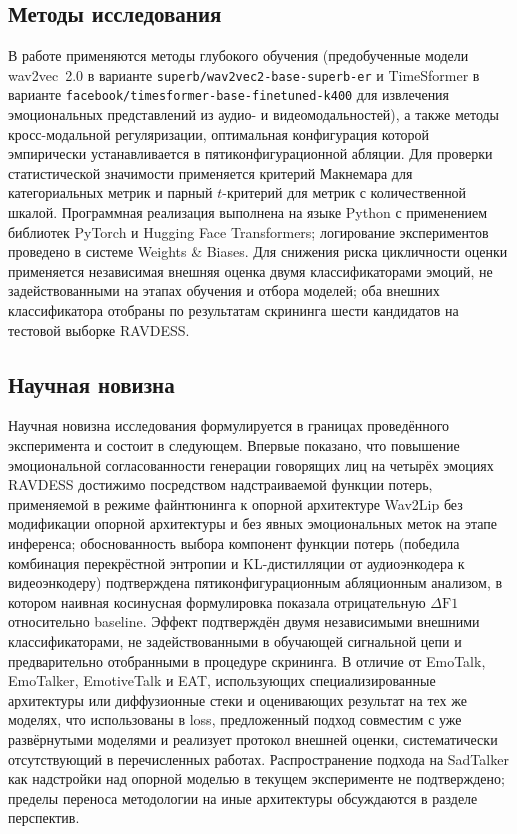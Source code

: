 \documentclass[a4paper, 12pt, oneside, openany]{article}
\begin{document}
\subsection{Методы исследования}

В работе применяются методы глубокого обучения (предобученные модели wav2vec~2.0 в варианте \texttt{superb/wav2vec2-base-superb-er} и TimeSformer в варианте \texttt{facebook/timesformer-base-finetuned-k400} для извлечения эмоциональных представлений из аудио- и видеомодальностей), а также методы кросс-модальной регуляризации, оптимальная конфигурация которой эмпирически устанавливается в пятиконфигурационной абляции. Для проверки статистической значимости применяется критерий Макнемара для категориальных метрик и парный $t$-критерий для метрик с количественной шкалой. Программная реализация выполнена на языке Python с применением библиотек PyTorch и Hugging Face Transformers; логирование экспериментов проведено в системе Weights \& Biases. Для снижения риска цикличности оценки применяется независимая внешняя оценка двумя классификаторами эмоций, не задействованными на этапах обучения и отбора моделей; оба внешних классификатора отобраны по результатам скрининга шести кандидатов на тестовой выборке RAVDESS.

\subsection{Научная новизна}

Научная новизна исследования формулируется в границах проведённого эксперимента и состоит в следующем. Впервые показано, что повышение эмоциональной согласованности генерации говорящих лиц на четырёх эмоциях RAVDESS достижимо посредством надстраиваемой функции потерь, применяемой в режиме файнтюнинга к опорной архитектуре Wav2Lip без модификации опорной архитектуры и без явных эмоциональных меток на этапе инференса; обоснованность выбора компонент функции потерь (победила комбинация перекрёстной энтропии и KL-дистилляции от аудиоэнкодера к видеоэнкодеру) подтверждена пятиконфигурационным абляционным анализом, в котором наивная косинусная формулировка показала отрицательную $\Delta\text{F1}$ относительно baseline. Эффект подтверждён двумя независимыми внешними классификаторами, не задействованными в обучающей сигнальной цепи и предварительно отобранными в процедуре скрининга. В отличие от EmoTalk, EmoTalker, EmotiveTalk и EAT, использующих специализированные архитектуры или диффузионные стеки и оценивающих результат на тех же моделях, что использованы в loss, предложенный подход совместим с уже развёрнутыми моделями и реализует протокол внешней оценки, систематически отсутствующий в перечисленных работах. Распространение подхода на SadTalker как надстройки над опорной моделью в текущем эксперименте не подтверждено; пределы переноса методологии на иные архитектуры обсуждаются в разделе перспектив.
\end{document}
